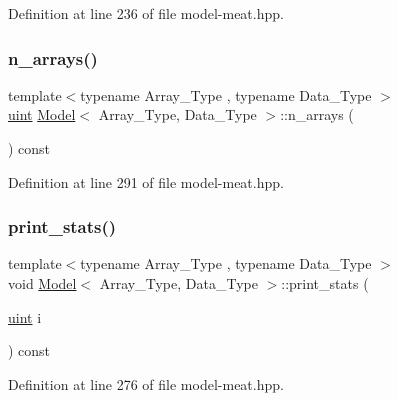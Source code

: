 Definition at line 236 of file model-\/meat.\+hpp.

\mbox{\label{class_model_a35678412d71c9f96aa19099c72179f3d}} 
\subsubsection{\texorpdfstring{n\+\_\+arrays()}{n\_arrays()}}
{\footnotesize\ttfamily template$<$typename Array\+\_\+\+Type , typename Data\+\_\+\+Type $>$ \\
\hyperlink{typedefs_8hpp_a91ad9478d81a7aaf2593e8d9c3d06a14}{uint} \hyperlink{class_model}{Model}$<$ Array\+\_\+\+Type, Data\+\_\+\+Type $>$\+::n\+\_\+arrays (\begin{DoxyParamCaption}{ }\end{DoxyParamCaption}) const\hspace{0.3cm}{\ttfamily [inline]}}



Definition at line 291 of file model-\/meat.\+hpp.

\mbox{\label{class_model_a1109a7cacf9993aa3189240bc41d5bec}} 
\subsubsection{\texorpdfstring{print\+\_\+stats()}{print\_stats()}}
{\footnotesize\ttfamily template$<$typename Array\+\_\+\+Type , typename Data\+\_\+\+Type $>$ \\
void \hyperlink{class_model}{Model}$<$ Array\+\_\+\+Type, Data\+\_\+\+Type $>$\+::print\+\_\+stats (\begin{DoxyParamCaption}\item[{\hyperlink{typedefs_8hpp_a91ad9478d81a7aaf2593e8d9c3d06a14}{uint}}]{i }\end{DoxyParamCaption}) const\hspace{0.3cm}{\ttfamily [inline]}}



Definition at line 276 of file model-\/meat.\+hpp.

\mbox{\label{class_model_aee8f9832e77a43f29b3767ae91b9a0ad}} 
